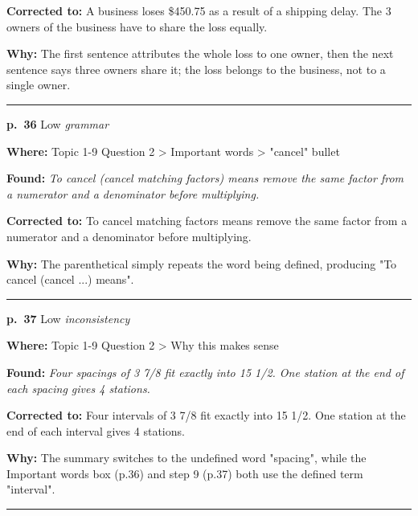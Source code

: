 \documentclass[11pt]{article}
\newcommand{\sevlow}[1]{\textcolor{black!55}{#1}}
\begin{document}
\noindent\textbf{Corrected to: }A business loses \$450.75 as a result of a shipping delay. The 3 owners of the business have to share the loss equally.\par
\noindent\textbf{Why: }The first sentence attributes the whole loss to one owner, then the next sentence says three owners share it; the loss belongs to the business, not to a single owner.\par\vspace{4pt}
\noindent\rule{\textwidth}{0.4pt}\par\nobreak\vspace{2pt}
\noindent\textbf{p.~36} \quad \sevlow{Low} \quad \textit{grammar}\par
\noindent\textbf{Where: }Topic 1-9 Question 2 > Important words > "cancel" bullet\par
\noindent\textbf{Found: }\textit{To cancel (cancel matching factors) means remove the same factor from a numerator and a denominator before multiplying.}\par
\noindent\textbf{Corrected to: }To cancel matching factors means remove the same factor from a numerator and a denominator before multiplying.\par
\noindent\textbf{Why: }The parenthetical simply repeats the word being defined, producing "To cancel (cancel ...) means".\par\vspace{4pt}
\noindent\rule{\textwidth}{0.4pt}\par\nobreak\vspace{2pt}
\noindent\textbf{p.~37} \quad \sevlow{Low} \quad \textit{inconsistency}\par
\noindent\textbf{Where: }Topic 1-9 Question 2 > Why this makes sense\par
\noindent\textbf{Found: }\textit{Four spacings of 3 7/8 fit exactly into 15 1/2. One station at the end of each spacing gives 4 stations.}\par
\noindent\textbf{Corrected to: }Four intervals of 3 7/8 fit exactly into 15 1/2. One station at the end of each interval gives 4 stations.\par
\noindent\textbf{Why: }The summary switches to the undefined word "spacing", while the Important words box (p.36) and step 9 (p.37) both use the defined term "interval".\par\vspace{4pt}
\noindent\rule{\textwidth}{0.4pt}\par\nobreak\vspace{2pt}
\end{document}
